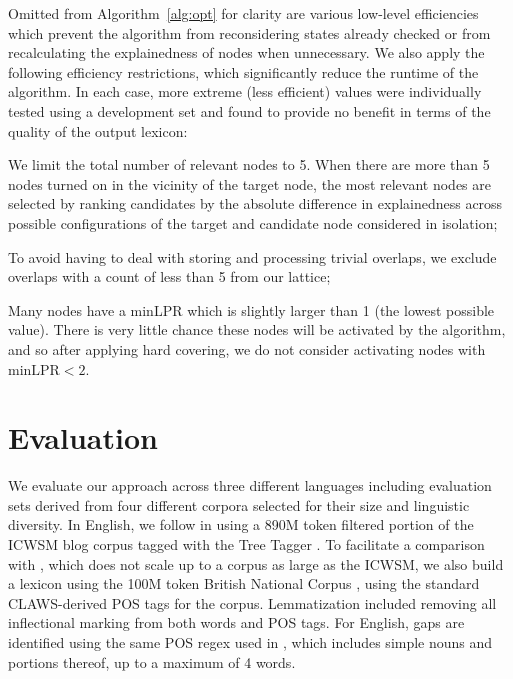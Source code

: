 \documentclass[11pt,letterpaper]{article}
\newcommand{\minLPR}{\ensuremath{\text{minLPR}}}
\newcommand{\algoref}[2][]{Algorithm#1~\ref{#2}\xspace}
\begin{document}
Omitted from \algoref{alg:opt} for clarity are various low-level efficiencies which prevent the algorithm from reconsidering states already checked or from recalculating the explainedness of nodes when unnecessary. We also apply the following efficiency restrictions, which significantly reduce the runtime of the algorithm. In each case, more extreme (less efficient) values were individually tested using a development set and found to provide no benefit in terms of the quality of the output lexicon:
\begin{compactitem}
\item We limit the total number of relevant nodes to 5. When there are more than 5 nodes turned on in the vicinity of the target node, the most relevant nodes are selected by ranking candidates by the absolute difference in explainedness across possible configurations of the target and candidate node considered in isolation;
\item To avoid having to deal with storing and processing trivial overlaps, we exclude overlaps with a count of less than 5 from our lattice;
\item Many nodes have a minLPR which is slightly larger than 1 (the lowest possible value). There is very little chance these nodes will be activated by the algorithm, and so after applying hard covering, we do not consider activating nodes with $\minLPR < 2$.
\end{compactitem}

\section{Evaluation}
\label{sec:evaluation}

We evaluate our approach across three different languages including evaluation sets derived from four different corpora selected for their size and linguistic diversity. In English, we follow  in using a 890M token filtered portion of the ICWSM blog corpus \cite{ICWSM} tagged with the Tree Tagger \cite{Schmid95}. To facilitate a comparison with , which does not scale up to a corpus as large as the ICWSM, we also build a lexicon using the 100M token British National Corpus \cite{BNC}, using the standard CLAWS-derived POS tags for the corpus. Lemmatization included removing all inflectional marking from both words and POS tags. For English, gaps are identified using the same POS regex used in , which includes simple nouns and portions thereof, up to a maximum of 4 words.
\end{document}
